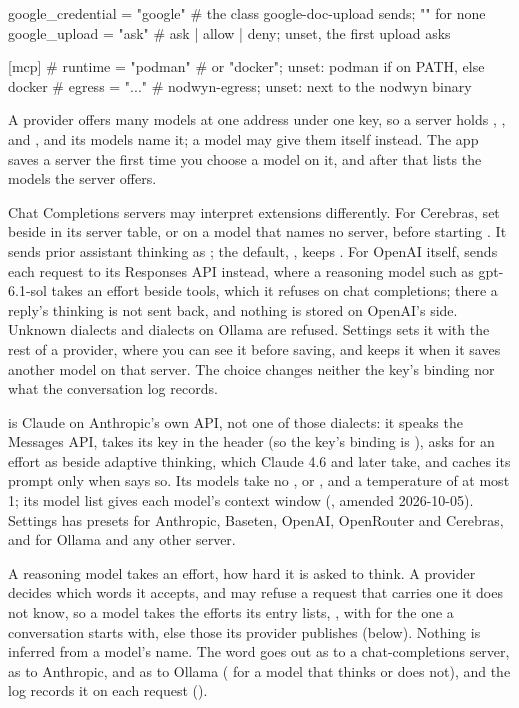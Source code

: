 \begin{txt}
[docs]
google_credential = "google"  # the class google-doc-upload sends; "" for none
google_upload = "ask"         # ask | allow | deny; unset, the first upload asks

[mcp]
# runtime = "podman"        # or "docker"; unset: podman if on PATH, else docker
# egress = "..."            # nodwyn-egress; unset: next to the nodwyn binary
\end{txt}

A provider offers many models at one address under one key, so a server
holds , ,  and ,
and its models name it; a model may give them itself instead. The app saves a
server the first time you choose a model on it, and after that lists the
models the server offers.

Chat Completions servers may interpret extensions differently. For Cerebras,
set  beside  in its
server table, or on a model that names no server, before starting \nodwyn{}.
It sends prior assistant thinking as ; the default,
, keeps . For OpenAI itself,
 sends each request to its Responses API
instead, where a reasoning model such as gpt-6.1-sol takes an effort beside
tools, which it refuses on chat completions; there a reply's thinking is not
sent back, and nothing is stored on OpenAI's side. Unknown dialects
and dialects on Ollama are refused. Settings sets it with the rest of a
provider, where you can see it before saving, and keeps it when it saves
another model on that server. The choice changes neither the key's binding
nor what the conversation log records.

 is Claude on Anthropic's own API, not one of
those dialects: it speaks the Messages API, takes its key in the
 header (so the key's binding is ),
asks for an effort as  beside adaptive thinking,
which Claude 4.6 and later take, and caches its prompt only when
 says so. Its models take no ,
 or , and a temperature of at most 1; its
model list gives each model's context window (, amended 2026-10-05).
Settings has presets for Anthropic, Baseten, OpenAI, OpenRouter and Cerebras,
and for Ollama and any other server.

A reasoning model takes an effort, how hard it is asked to think. A provider
decides which words it accepts, and may refuse a request that carries one it
does not know, so a model takes the efforts its entry lists,
, with  for
the one a conversation starts with, else those its provider publishes (below).
Nothing is inferred from a model's name.
The word goes out as  to a chat-completions server, as
 to Anthropic, and as  to Ollama (\code{["off", "on"]} for a model that thinks or does
not), and the log records it on each request ().

